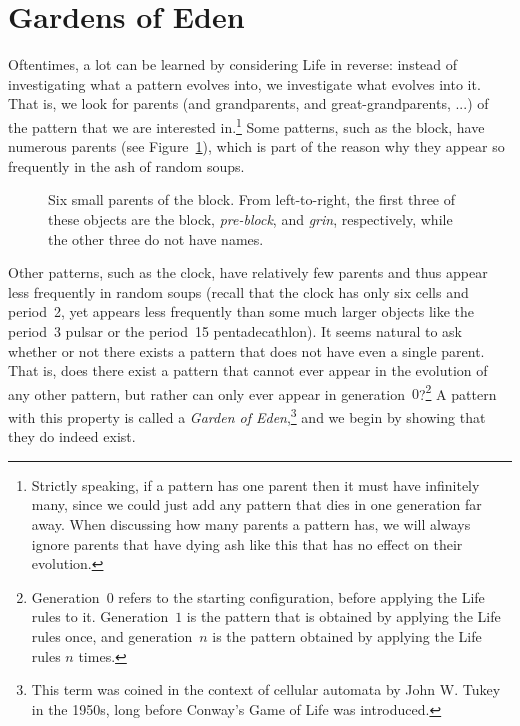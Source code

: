 \section{Gardens of Eden}\label{sec:goe}

Oftentimes, a lot can be learned by considering Life in reverse: instead of investigating what a pattern evolves into, we investigate what evolves into it. That is, we look for parents (and grandparents, and great-grandparents, ...) of the pattern that we are interested in.\footnote{Strictly speaking, if a pattern has one parent then it must have infinitely many, since we could just add any pattern that dies in one generation far away. When discussing how many parents a pattern has, we will always ignore parents that have dying ash like this that has no effect on their evolution.} Some patterns, such as the block, have numerous parents (see Figure~\ref{fig:block_parents}), which is part of the reason why they appear so frequently in the ash of random soups.

\begin{figure}[!htb]
	\centering{}
	\caption{Six small parents of the block. From left-to-right, the first three of these objects are the block, \emph{pre-block}, and \emph{grin}, respectively, while the other three do not have names.}\label{fig:block_parents}
\end{figure}

Other patterns, such as the clock, have relatively few parents and thus appear less frequently in random soups (recall that the clock has only six cells and period~2, yet appears less frequently than some much larger objects like the period~3 pulsar or the period~15 pentadecathlon). It seems natural to ask whether or not there exists a pattern that does not have even a single parent. That is, does there exist a pattern that cannot ever appear in the evolution of any other pattern, but rather can only ever appear in generation~$0$?\footnote{Generation~$0$ refers to the starting configuration, before applying the Life rules to it. Generation~$1$ is the pattern that is obtained by applying the Life rules once, and generation~$n$ is the pattern obtained by applying the Life rules $n$ times.} A pattern with this property is called a \emph{Garden of Eden},\footnote{This term was coined in the context of cellular automata by John W. Tukey in the 1950s, long before Conway's Game of Life was introduced.} and we begin by showing that they do indeed exist.

